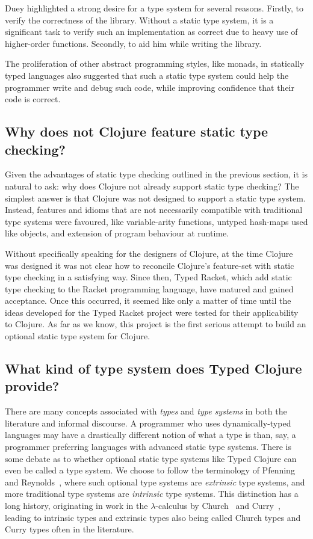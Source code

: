 Duey highlighted a strong desire for a type system for several reasons.
Firstly, to verify the correctness of the library.
Without a static type system, it is a significant task
to verify such an implementation as correct due to heavy use
of higher-order functions.
Secondly, to aid him while writing the library.

The proliferation of other abstract programming styles, like monads, in statically typed languages
also suggested that such a static type system could
help the programmer write and debug such code, while improving confidence that their code is correct.

\subsection{Why does not Clojure feature static type checking?}

Given the advantages of static type checking outlined in the previous section, it is natural to ask:
why does Clojure not already support static type checking?
The simplest answer is that Clojure was not designed to support a static type system.
Instead, features and idioms that are not necessarily compatible with traditional type systems
were favoured, like variable-arity functions, untyped hash-maps used like objects, and extension of program behaviour
at runtime.

Without specifically speaking for the designers of Clojure, at the time Clojure was designed
it was not clear how to reconcile Clojure's feature-set with static type checking in a satisfying way.
Since then, Typed Racket, which add static type checking to the Racket programming language,
have matured and gained acceptance.
Once this occurred, it seemed like only a matter of time until the ideas developed for the Typed Racket project 
were tested for their applicability to Clojure. 
As far as we know, this project is the first serious attempt to build an optional static type system for Clojure.

\subsection{What kind of type system does Typed Clojure provide?}


There are many concepts associated with \emph{types} and \emph{type systems} in both the
literature and informal discourse.
A programmer who uses dynamically-typed languages may have a drastically different notion
of what a type is than, say, a programmer preferring languages with advanced static type systems.
There is some debate as to whether optional static type systems like Typed Clojure
can even be called a type system. We choose to
follow the terminology of Pfenning~\cite{Pfe08} and Reynolds~\cite{Rey02},
where such optional type systems are \emph{extrinsic} type systems, and more
traditional type systems are \emph{intrinsic} type systems.
This distinction has a long history, originating in work in the $\lambda$-calculus 
by Church~\cite{Chu40} and Curry~\cite{Cur34},
leading to intrinsic types and extrinsic types also being called Church types and
Curry types often in the literature.

